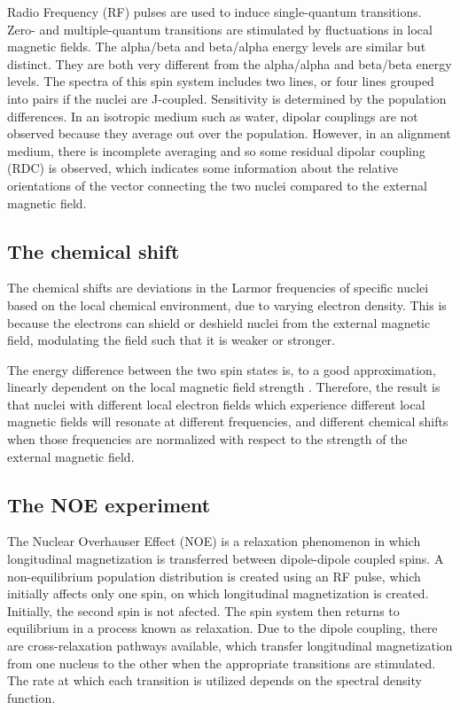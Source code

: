Radio Frequency (RF) pulses are used to induce single-quantum transitions.
Zero- and multiple-quantum transitions are stimulated by fluctuations in 
local magnetic fields.  The alpha/beta and beta/alpha energy levels are 
similar but distinct.  They are both very different from the alpha/alpha 
and beta/beta energy levels.  The spectra of this spin system includes 
two lines, or four lines grouped into pairs if the nuclei are J-coupled.
Sensitivity is determined by the population differences.
In an isotropic medium such as water, dipolar couplings are not observed
because they average out over the population.
However, in an alignment medium, there is incomplete averaging
and so some residual dipolar coupling (RDC) is observed, which indicates 
some information about the relative orientations of the vector connecting
the two nuclei compared to the external magnetic field.


\subsection*{The chemical shift}

The chemical shifts are deviations in the Larmor frequencies of specific 
nuclei based on the local chemical environment, due to varying
electron density.  This is because the electrons can shield or deshield nuclei
from the external magnetic field, modulating the field such that it is weaker
or stronger.

The energy difference between the two spin states is, to a good approximation,
linearly dependent on the local magnetic field strength 
\cite{cavanagh1995protein}.  Therefore, the 
result is that nuclei with different local electron fields which experience
different local magnetic fields will resonate at different frequencies, and
different chemical shifts when those frequencies are normalized with respect
to the strength of the external magnetic field.


\subsection*{The NOE experiment}

The Nuclear Overhauser Effect (NOE) is a relaxation phenomenon in which
longitudinal magnetization is transferred between dipole-dipole coupled spins.
A non-equilibrium population distribution is created using an RF pulse,
which initially affects only one spin, on which
longitudinal magnetization is created.  Initially, the second spin is not
afected.  The spin system then returns to
equilibrium in a process known as relaxation.  Due to the dipole coupling,
there are cross-relaxation pathways available, which transfer longitudinal
magnetization from one nucleus to the other when the appropriate transitions
are stimulated.  The rate at which each transition is utilized depends on the
spectral density function.

